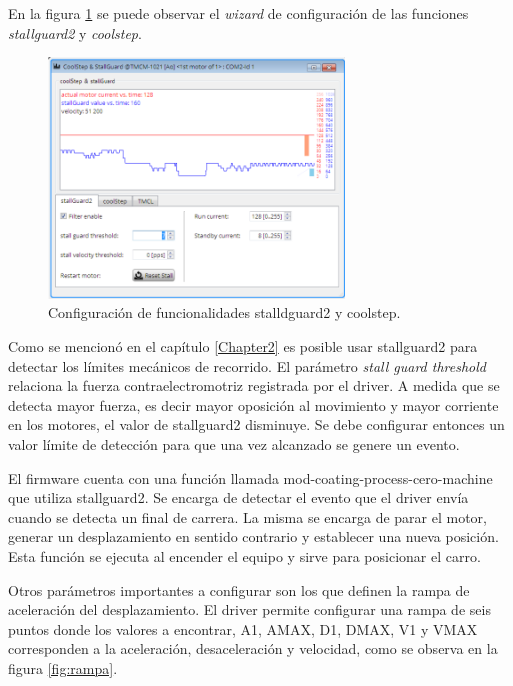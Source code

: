 En la figura \ref{fig:tmcl_ide_stall} se puede observar el \textit{wizard} de configuración de las funciones \textit{stallguard2} y \textit{coolstep}.

\begin{figure}[h!]
	\centering
	\includegraphics[width=0.7\textwidth]{./Figures/tmcl_ide_2.png}
	\caption{Configuración de funcionalidades stalldguard2 y coolstep.}
	\label{fig:tmcl_ide_stall}
\end{figure}

Como se mencionó en el capítulo \ref{Chapter2} es posible usar stallguard2 para detectar los límites mecánicos de recorrido. El parámetro \textit{stall guard threshold} relaciona la fuerza contraelectromotriz registrada por el driver. A medida que se detecta mayor fuerza, es decir mayor oposición al movimiento y mayor corriente en los motores, el valor de stallguard2 disminuye. Se debe configurar entonces un valor límite de detección para que una vez alcanzado se genere un evento.

El firmware cuenta con una función llamada mod-coating-process-cero-machine que utiliza stallguard2. Se encarga de detectar el evento que el driver envía cuando se detecta un final de carrera. La misma se encarga de parar el motor, generar un desplazamiento en sentido contrario y establecer una nueva posición. Esta función se ejecuta al encender el equipo y sirve para posicionar el carro.
 



Otros parámetros importantes a configurar son los que definen la rampa de aceleración del desplazamiento. El driver permite configurar una rampa de seis puntos donde los valores a encontrar, A1, AMAX, D1, DMAX, V1 y VMAX corresponden a la aceleración, desaceleración y velocidad, como se observa en la figura \ref{fig:rampa}.

